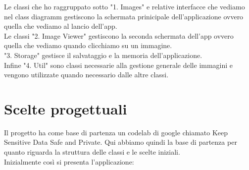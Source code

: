 \documentclass{article}
\begin{document}
Le classi che ho raggruppato sotto "1. Images" e relative interfacce che vediamo nel class diagramm gestiscono la schermata prinicipale dell'applicazione ovvero quella che vediamo al lancio dell'app.\\
Le classi "2. Image Viewer" gestiscono la seconda schermata dell'app ovvero quella che vediamo quando clicchiamo su un immagine.\\
"3. Storage" gestisce il salvataggio e la memoria dell'applicazione.\\ Infine "4. Util" sono classi necessarie alla gestione generale delle immagini e vengono utilizzate quando necessario dalle altre classi.

\newpage
\section{Scelte progettuali}
Il progetto ha come base di partenza un codelab di google chiamato Keep Sensitive Data Safe and Private. Qui abbiamo quindi la base di partenza per quanto riguarda la struttura delle classi e le scelte iniziali.\\
Inizialmente così si presenta l'applicazione:
\end{document}
